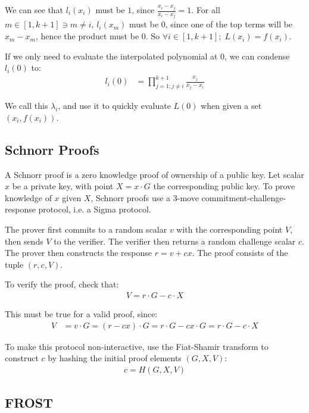 \documentclass{article}
\begin{document}
We can see that $l_i(x_i)$ must be $1$, since $\frac{x_i - x_j}{x_i - x_j} = 1$.  For all $m \in [1, k+1] \ni m \neq i$, $l_i(x_m)$ must be $0$, since one of the top terms will be $x_m - x_m$, hence the product must be $0$.  So $\forall i \in [1,k+1];\; L(x_i) = f(x_i)$.

If we only need to evaluate the interpolated polynomial at $0$, we can condense $l_i(0)$ to:
\begin{align}
  l_i(0) &= \prod_{j=1; j \neq i}^{k+1} \frac{x_j}{x_j - x_i}
\end{align}

We call this $\lambda_i$, and use it to quickly evaluate $L(0)$ when given a set $(x_i, f(x_i))$.

\newpage
\onecolumn

\subsection{
  Schnorr Proofs
}

A Schnorr proof \cite{schnorr} is a zero knowledge proof of ownership of a public key.  Let scalar $x$ be a private key, with point $X = x \cdot G$ the corresponding public key.  To prove knowledge of $x$ given $X$, Schnorr proofs use a $3$-move commitment-challenge-response protocol, i.e. a Sigma protocol.

The prover first commits to a random scalar $v$ with the corresponding point $V$, then sends $V$ to the verifier.  The verifier then returns a random challenge scalar $c$.  The prover then constructs the response $r = v + cx$.  The proof consists of the tuple $(r, c, V)$.

To verify the proof, check that:
\begin{align}
  V = r \cdot G - c \cdot X
\end{align}

This must be true for a valid proof, since:
\begin{align}
  V &= v \cdot G = (r - cx) \cdot G = r \cdot G - cx \cdot G = r \cdot G - c \cdot X\nonumber
\end{align}

To make this protocol non-interactive, use the Fiat-Shamir transform \cite{fiatshamir} to construct $c$ by hashing the initial proof elements $(G, X, V)$:
\begin{align}
  c = H(G, X, V)
\end{align}

\subsection{
  FROST
}
\end{document}
